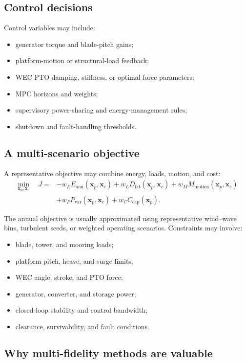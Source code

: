 \documentclass[11pt]{article}
\newcommand{\vect}[1]{\boldsymbol{#1}}
\newcommand{\xp}{\vect{x}_p}
\newcommand{\xc}{\vect{x}_c}
\begin{document}
\subsection{Control decisions}

Control variables may include:
\begin{itemize}[leftmargin=1.4em]
  \item generator torque and blade-pitch gains;
  \item platform-motion or structural-load feedback;
  \item WEC PTO damping, stiffness, or optimal-force parameters;
  \item MPC horizons and weights;
  \item supervisory power-sharing and energy-management rules;
  \item shutdown and fault-handling thresholds.
\end{itemize}

\subsection{A multi-scenario objective}

A representative objective may combine energy, loads, motion, and cost:
\begin{align}
\min_{\xp,\xc}\quad
J = &-w_E E_{\mathrm{ann}}(\xp,\xc)
+w_L D_{\mathrm{fat}}(\xp,\xc)
+w_M M_{\mathrm{motion}}(\xp,\xc) \\
&+w_P P_{\mathrm{var}}(\xp,\xc)
+w_C C_{\mathrm{cap}}(\xp).
\label{eq:wind-wave-objective}
\end{align}

The annual objective is usually approximated using representative wind--wave bins, turbulent seeds, or weighted operating scenarios. Constraints may involve:
\begin{itemize}[leftmargin=1.4em]
  \item blade, tower, and mooring loads;
  \item platform pitch, heave, and surge limits;
  \item WEC angle, stroke, and PTO force;
  \item generator, converter, and storage power;
  \item closed-loop stability and control bandwidth;
  \item clearance, survivability, and fault conditions.
\end{itemize}

\subsection{Why multi-fidelity methods are valuable}
\end{document}
